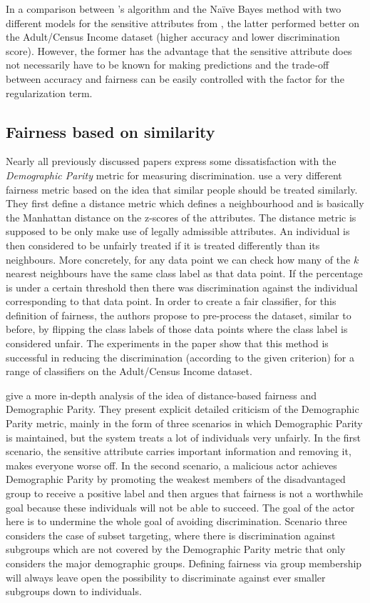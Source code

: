 In a comparison between \citet{kamishima2011fairness}'s algorithm
and the Na\"ive Bayes method with two different models for the sensitive attributes from \citet{calders2010three},
the latter performed better on the Adult/Census Income dataset
(higher accuracy and lower discrimination score).
However, the former has the advantage
that the sensitive attribute does not necessarily have to be known for making predictions
and the trade-off between accuracy and fairness can be easily controlled
with the factor for the regularization term.

\subsection{Fairness based on similarity}%
\label{fairness-based-on-similarity}
Nearly all previously discussed papers express some dissatisfaction
with the \emph{Demographic Parity} metric for measuring discrimination.
\citet{luong2011k} use a very different fairness metric
based on the idea that similar people should be treated similarly.
They first define a distance metric which defines a neighbourhood
and is basically the Manhattan distance on the z-scores of the attributes.
The distance metric is supposed to be only make use of legally admissible attributes.
An individual is then considered to be unfairly treated
if it is treated differently than its neighbours.
More concretely, for any data point we can check
how many of the \(k\) nearest neighbours have the same class label as that data point.
If the percentage is under a certain threshold
then there was discrimination against the individual corresponding to that data point.
In order to create a fair classifier, for this definition of fairness,
the authors propose to pre-process the dataset,
similar to \citet{kamiran2009classifying} before,
by flipping the class labels of those data points where the class label is considered unfair.
The experiments in the paper show that this method is successful in reducing the discrimination
(according to the given criterion)
for a range of classifiers on the Adult/Census Income dataset.

\citet{dwork2012fairness} give a more in-depth analysis
of the idea of distance-based fairness and Demographic Parity.
They present explicit detailed criticism of the Demographic Parity metric,
mainly in the form of three scenarios in which Demographic Parity is maintained,
but the system treats a lot of individuals very unfairly.
In the first scenario, the sensitive attribute carries important information
and removing it, makes everyone worse off.
In the second scenario, a malicious actor achieves Demographic Parity
by promoting the weakest members of the disadvantaged group to receive a positive label
and then argues that fairness is not a worthwhile goal
because these individuals will not be able to succeed.
The goal of the actor here is to undermine the whole goal of avoiding discrimination.
Scenario three considers the case of subset targeting,
where there is discrimination against subgroups
which are not covered by the Demographic Parity metric
that only considers the major demographic groups.
Defining fairness via group membership will always leave open the possibility
to discriminate against ever smaller subgroups down to individuals.


